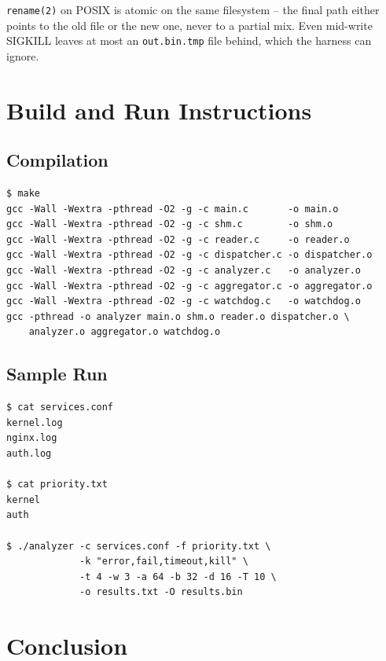 \documentclass[11pt,a4paper]{article}
\newcommand{\code}[1]{\texttt{\small #1}}
\begin{document}
\code{rename(2)} on POSIX is atomic on the same filesystem -- the
final path either points to the old file or the new one, never to a
partial mix. Even mid-write SIGKILL leaves at most an
\code{out.bin.tmp} file behind, which the harness can ignore.

\section{Build and Run Instructions}

\subsection{Compilation}

\begin{lstlisting}[style=Bashstyle]
$ make
gcc -Wall -Wextra -pthread -O2 -g -c main.c       -o main.o
gcc -Wall -Wextra -pthread -O2 -g -c shm.c        -o shm.o
gcc -Wall -Wextra -pthread -O2 -g -c reader.c     -o reader.o
gcc -Wall -Wextra -pthread -O2 -g -c dispatcher.c -o dispatcher.o
gcc -Wall -Wextra -pthread -O2 -g -c analyzer.c   -o analyzer.o
gcc -Wall -Wextra -pthread -O2 -g -c aggregator.c -o aggregator.o
gcc -Wall -Wextra -pthread -O2 -g -c watchdog.c   -o watchdog.o
gcc -pthread -o analyzer main.o shm.o reader.o dispatcher.o \
    analyzer.o aggregator.o watchdog.o
\end{lstlisting}

\subsection{Sample Run}

\begin{lstlisting}[style=Bashstyle]
$ cat services.conf
kernel.log
nginx.log
auth.log

$ cat priority.txt
kernel
auth

$ ./analyzer -c services.conf -f priority.txt \
             -k "error,fail,timeout,kill" \
             -t 4 -w 3 -a 64 -b 32 -d 16 -T 10 \
             -o results.txt -O results.bin
\end{lstlisting}

\section{Conclusion}
\end{document}
